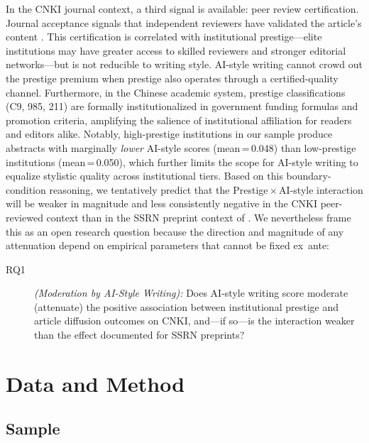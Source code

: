 \documentclass[12pt,a4paper]{article}
\begin{document}
In the CNKI journal context, a third signal is available: peer review
certification.
Journal acceptance signals that independent reviewers have validated
the article's content \citep{Bornmann2008}.
This certification is correlated with institutional prestige---elite
institutions may have greater access to skilled reviewers and stronger
editorial networks---but is not reducible to writing style.
AI-style writing cannot crowd out the prestige premium when prestige
also operates through a certified-quality channel.
Furthermore, in the Chinese academic system, prestige classifications
(C9, 985, 211) are formally institutionalized in government funding
formulas and promotion criteria, amplifying the salience of
institutional affiliation for readers and editors alike.
Notably, high-prestige institutions in our sample produce abstracts
with marginally \textit{lower} AI-style scores (mean\,=\,0.048)
than low-prestige institutions (mean\,=\,0.050), which further
limits the scope for AI-style writing to equalize stylistic quality
across institutional tiers.
Based on this boundary-condition reasoning, we tentatively predict
that the Prestige\,$\times$\,AI-style interaction will be weaker in
magnitude and less consistently negative in the CNKI peer-reviewed
context than in the SSRN preprint context of \citet{JoLi2026}.
We nevertheless frame this as an open research question because the
direction and magnitude of any attenuation depend on empirical
parameters that cannot be fixed ex~ante:
\begin{description}
  \item[RQ1] \textit{(Moderation by AI-Style Writing):}
  Does AI-style writing score moderate (attenuate) the positive
  association between institutional prestige and article diffusion
  outcomes on CNKI, and---if so---is the interaction weaker than
  the effect documented for SSRN preprints?
\end{description}

\section{Data and Method}
\label{sec:method}

\subsection{Sample}
\end{document}
